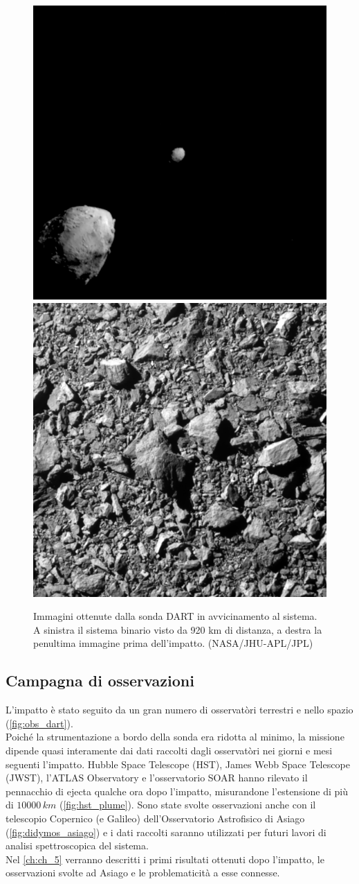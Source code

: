\documentclass[a4paper,11pt,openright]{book}
\begin{document}
\begin{figure}[!h]
\centering
	{\includegraphics[width=.48\textwidth]{figure/920.png}} \quad
	{\includegraphics[width=.48\textwidth]{figure/penultima_dart.png}}
\caption[Immagini ottenute dalla sonda DART in avvicinamento al sistema.]{Immagini ottenute dalla sonda DART in avvicinamento al sistema. A sinistra il sistema binario visto da 920 km di distanza, a destra la penultima immagine prima dell'impatto. (NASA/JHU-APL/JPL)}
\label{fig:920_penultima_dart}
\end{figure}

\subsection{Campagna di osservazioni}
L'impatto è stato seguito da un gran numero di osservatòri terrestri e nello spazio (\cref{fig:obs_dart}).\\
Poiché la strumentazione a bordo della sonda era ridotta al minimo, la missione dipende quasi interamente dai dati raccolti dagli osservatòri nei giorni e mesi seguenti l'impatto.
Hubble Space Telescope (HST), James Webb Space Telescope (JWST), l'ATLAS Observatory e l'osservatorio SOAR hanno rilevato il pennacchio di ejecta qualche ora dopo l'impatto, misurandone l'estensione di più di $10000\,km$ (\cref{fig:hst_plume}). Sono state svolte osservazioni anche con il telescopio Copernico (e Galileo) dell'Osservatorio Astrofisico di Asiago (\cref{fig:didymos_asiago}) e i dati raccolti saranno utilizzati per futuri lavori di analisi spettroscopica del sistema.\\
Nel \cref{ch:ch_5} verranno descritti i primi risultati ottenuti dopo l'impatto, le osservazioni svolte ad Asiago e le problematicità a esse connesse.
\end{document}
